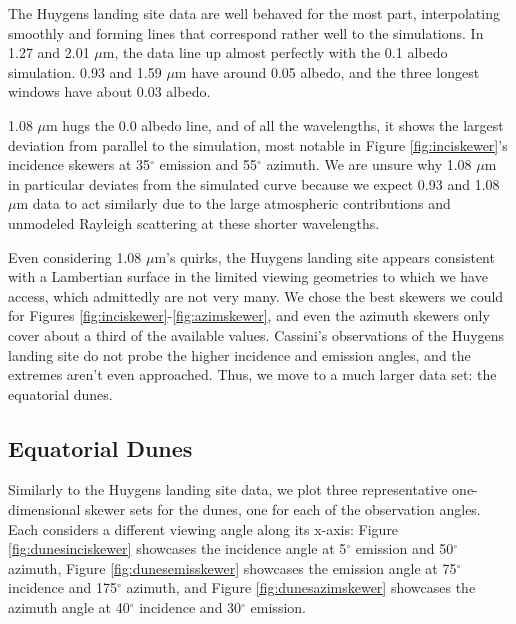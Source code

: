 \documentclass[twocolumn,linenumbers]{aastex631}
\begin{document}
The Huygens landing site data are well behaved for the most part, interpolating smoothly and forming lines that correspond rather well to the simulations. In 1.27 and 2.01 $\mu$m, the data line up almost perfectly with the 0.1 albedo simulation. 0.93 and 1.59 $\mu$m have around 0.05 albedo, and the three longest windows have about 0.03 albedo.

1.08 $\mu$m hugs the 0.0 albedo line, and of all the wavelengths, it shows the largest deviation from parallel to the simulation, most notable in Figure \ref{fig:inciskewer}'s incidence skewers at 35$^{\circ}$ emission and 55$^{\circ}$ azimuth. We are unsure why 1.08 $\mu$m in particular deviates from the simulated curve because we expect 0.93 and 1.08 $\mu$m data to act similarly due to the large atmospheric contributions and unmodeled Rayleigh scattering at these shorter wavelengths.

Even considering 1.08 $\mu$m's quirks, the Huygens landing site appears consistent with a Lambertian surface in the limited viewing geometries to which we have access, which admittedly are not very many. We chose the best skewers we could for Figures \ref{fig:inciskewer}-\ref{fig:azimskewer}, and even the azimuth skewers only cover about a third of the available values. Cassini's observations of the Huygens landing site do not probe the higher incidence and emission angles, and the extremes aren't even approached. Thus, we move to a much larger data set: the equatorial dunes.

\subsection{Equatorial Dunes} \label{sec:dunesC}

Similarly to the Huygens landing site data, we plot three representative one-dimensional skewer sets for the dunes, one for each of the observation angles. Each considers a different viewing angle along its x-axis: Figure \ref{fig:dunesinciskewer} showcases the incidence angle at 5$^{\circ}$ emission and 50$^{\circ}$ azimuth, Figure \ref{fig:dunesemisskewer} showcases the emission angle at 75$^{\circ}$ incidence and 175$^{\circ}$ azimuth, and Figure \ref{fig:dunesazimskewer} showcases the azimuth angle at 40$^{\circ}$ incidence and 30$^{\circ}$ emission.
\end{document}

